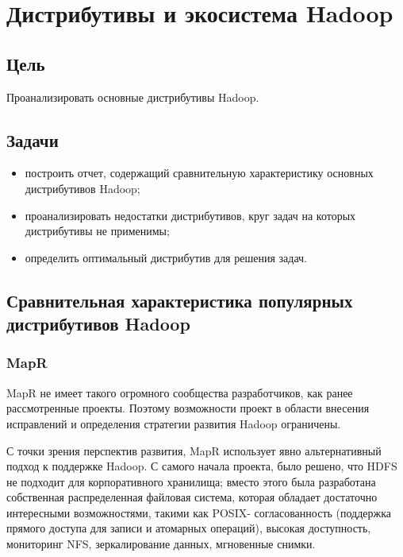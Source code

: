 



\newcommand{\labnumber}{2} %



\usepackage{longtable,tabu}

\graphicspath{{figures/}}


\Ukrainian


\addtocounter{page}{1}

\section{Дистрибутивы и экосистема Hadoop}
\subsection*{Цель}
Проанализировать основные дистрибутивы Hadoop.
\subsection*{Задачи}
\begin{itemize}
    \item построить	отчет,	содержащий	сравнительную характеристику основных дистрибутивов Hadoop;
    \item проанализировать недостатки дистрибутивов, круг задач на которых дистрибутивы не применимы;
    \item определить оптимальный дистрибутив для решения задач.
\end{itemize}

\subsection{Сравнительная характеристика популярных дистрибутивов Hadoop}
\subsubsection{MapR}
MapR не имеет такого огромного сообщества разработчиков, как ранее рассмотренные проекты. Поэтому возможности проект в области внесения исправлений и определения стратегии развития Hadoop ограничены.

С точки зрения перспектив развития, MapR использует явно альтернативный подход к поддержке Hadoop. С самого начала проекта, было решено, что HDFS не подходит для корпоративного хранилища; вместо этого была разработана собственная распределенная файловая система, которая обладает достаточно интересными возможностями, такими как POSIX- согласованность (поддержка прямого доступа для записи и атомарных операций), высокая доступность, мониторинг NFS, зеркалирование данных, мгновенные снимки.

